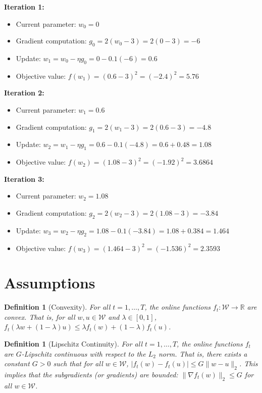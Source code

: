 \documentclass{article}
\newtheorem{definition}[theorem]{Definition}
\begin{document}
\textbf{Iteration 1:}
\begin{itemize}
\item Current parameter: $w_0 = 0$
\item Gradient computation: $g_0 = 2(w_0 - 3) = 2(0 - 3) = -6$
\item Update: $w_1 = w_0 - \eta g_0 = 0 - 0.1(-6) = 0.6$
\item Objective value: $f(w_1) = (0.6 - 3)^2 = (-2.4)^2 = 5.76$
\end{itemize}

\textbf{Iteration 2:}
\begin{itemize}
\item Current parameter: $w_1 = 0.6$
\item Gradient computation: $g_1 = 2(w_1 - 3) = 2(0.6 - 3) = -4.8$
\item Update: $w_2 = w_1 - \eta g_1 = 0.6 - 0.1(-4.8) = 0.6 + 0.48 = 1.08$
\item Objective value: $f(w_2) = (1.08 - 3)^2 = (-1.92)^2 = 3.6864$
\end{itemize}

\textbf{Iteration 3:}
\begin{itemize}
\item Current parameter: $w_2 = 1.08$
\item Gradient computation: $g_2 = 2(w_2 - 3) = 2(1.08 - 3) = -3.84$
\item Update: $w_3 = w_2 - \eta g_2 = 1.08 - 0.1(-3.84) = 1.08 + 0.384 = 1.464$
\item Objective value: $f(w_3) = (1.464 - 3)^2 = (-1.536)^2 = 2.3593$
\end{itemize}

\section*{Assumptions}
\begin{definition}[Convexity]
For all $t = 1, \dots, T$, the online functions $f_t : \mathcal{W} \to \mathbb{R}$ are convex. That is, for all $w, u \in \mathcal{W}$ and $\lambda \in [0, 1]$,
$f_t(\lambda w + (1-\lambda)u) \leq \lambda f_t(w) + (1-\lambda) f_t(u)$.
\end{definition}

\begin{definition}[Lipschitz Continuity]
For all $t = 1, \dots, T$, the online functions $f_t$ are $G$-Lipschitz continuous with respect to the $L_2$ norm. That is, there exists a constant $G > 0$ such that for all $w \in \mathcal{W}$,
$|f_t(w) - f_t(u)| \leq G \|w - u\|_2$.
This implies that the subgradients (or gradients) are bounded: $\|\nabla f_t(w)\|_2 \leq G$ for all $w \in \mathcal{W}$.
\end{definition}
\end{document}
